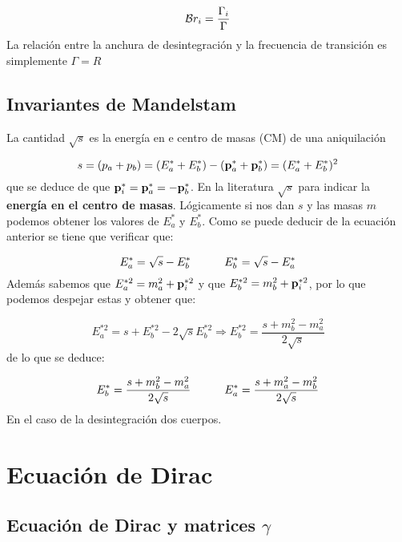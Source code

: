 \begin{equation}
	\mathcal{B} r_i = \frac{\Gamma_i}{\Gamma}
\end{equation}
La relación entre la anchura de desintegración y la frecuencia de transición es simplemente $\Gamma=R$

\subsection{Invariantes de Mandelstam}

La cantidad $\sqrt{s}$ es la energía en e centro de masas (CM) de una aniquilación

\begin{equation}
	s = (p_a+p_b) = (E_a^*+E_b^*)-(\mathbf{p}_a^*+\mathbf{p}_b^*) = (E_a^*+E_b^*)^2
\end{equation}
que se deduce de que $\mathbf{p}_i^*=\mathbf{p}_a^*=-\mathbf{p}_b^*$. En la literatura $\sqrt{s}$ para indicar la \textbf{energía en el centro de masas}. Lógicamente si nos dan $s$ y las masas $m$ podemos obtener los valores de $E_a^*$ y $E_b^*$. Como se puede deducir de la ecuación anterior se tiene que verificar que:

\begin{equation}
	E_a^* = \sqrt{s}-E_b^* \quad \quad \quad E_b^* = \sqrt{s}-E_a^*
\end{equation}
Además sabemos que $E_a^{*2}=m_a^2+\mathbf{p}_i^{*2}$ y que $E_b^{*2}=m_b^2+\mathbf{p}_i^{*2}$, por lo que podemos despejar estas y obtener que:

\begin{equation*}
	E_a^{*2} = s + E_b^{*2} - 2\sqrt{s} E_b^{*2} \Rightarrow E_b^{*2} = \frac{s+m_b^2-m_a^2}{2\sqrt{s}}
\end{equation*}
de lo que se deduce:


\begin{equation*}
	E_b^{*} = \frac{s+m_b^2-m_a^2}{2\sqrt{s}} \quad \quad \quad E_a^{*} = \frac{s+m_a^2-m_b^2}{2\sqrt{s}}
\end{equation*}
En el caso de la desintegración dos cuerpos.

\section{Ecuación de Dirac}



\subsection{Ecuación de Dirac y matrices $\gamma$}

